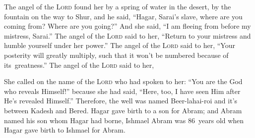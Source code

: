 \begin{inparaenum}
     The angel of the \textsc{Lord} found her by a spring of water in the desert, by the fountain on the way to Shur,%
     and he said, ``Hagar, Sarai's slave, where are you coming from? Where are you going?'' And she said, ``I am fleeing from before my mistress, Sarai.''%
     The angel of the \textsc{Lord} said to her, ``Return to your mistress and humble yourself under her power.'' %
     The angel of the \textsc{Lord} said to her, ``Your posterity will greatly multiply, such that it won't be numbered because of its\understood\ greatness.''%
     The angel of the \textsc{Lord} said to her,%
    
    
    
    
    
    {\noindent{} She called on the name of the \textsc{Lord} who had spoken to her: ``You are the God who reveals Himself!'' because she had said, ``Here, too, I have seen Him after He's revealed Himself.''}%
     Therefore, the well was named Beer-lahai-roi and it's between Kadesh and Bered.%
     Hagar gave birth to a son for Abram; and Abram named his son whom Hagar had borne, Ishmael%
     Abram was 86~years old when Hagar gave birth to Ishmael for Abram.%
\end{inparaenum}
